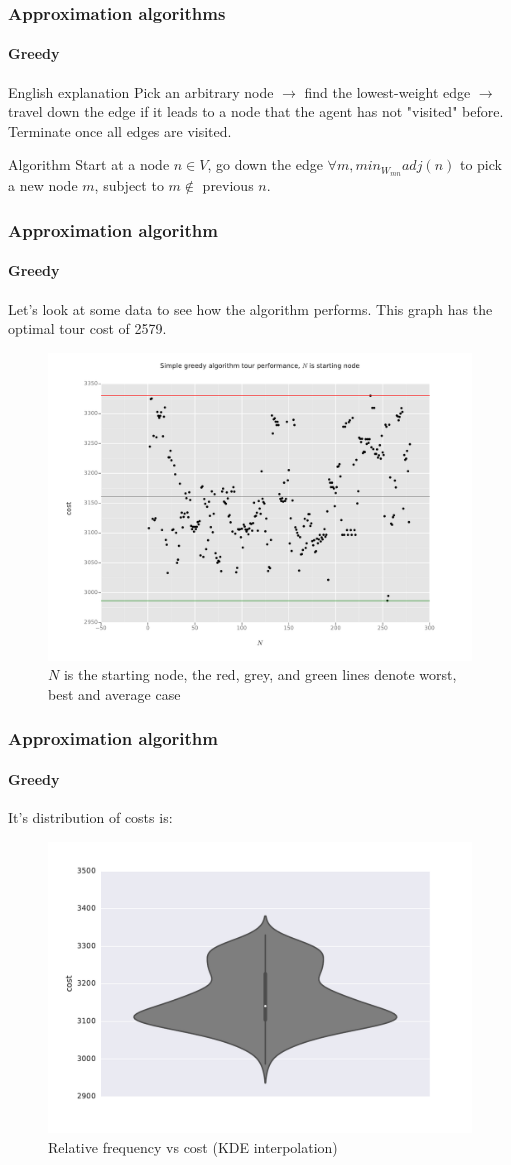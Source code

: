 \documentclass[11pt]{beamer}
\begin{document}
	\begin{frame}
		\frametitle{Approximation algorithms}
		\framesubtitle{Greedy}
		\begin{block}{English explanation}
			Pick an arbitrary node $\rightarrow$ find the lowest-weight edge $\rightarrow$ travel down the edge if it leads to a node that the agent has not "visited" before. Terminate once all edges are visited.
		\end{block}
		\begin{block}{Algorithm}
			Start at a node $n \in V$, go down the edge $\forall m, min_W_{mn} adj(n)$ to pick a new node $m$, subject to $m\notin$ previous $n$.
		\end{block}
	\end{frame}
	\begin{frame}
		\frametitle{Approximation algorithm}
		\framesubtitle{Greedy}
		\centering
		Let's look at some data to see how the algorithm performs. This graph has the optimal tour cost of 2579. 
		\begin{figure}
			\centering
			\includegraphics[width=0.7\linewidth]{"img/Simple greedy approach, small graph/scatter_vis"}
			\caption{$N$ is the starting node, the red, grey, and green lines denote worst, best and average case}
		\end{figure}
	\end{frame}
	\begin{frame}
		\frametitle{Approximation algorithm}
		\framesubtitle{Greedy}
		\centering
		It's distribution of costs is:
		\begin{figure}
			\centering
			\includegraphics[width=0.7\linewidth]{"img/Simple greedy approach, small graph/dist_across_cost"}
			\caption{Relative frequency vs cost (KDE interpolation)}
		\end{figure}
	\end{frame}
\end{document}
